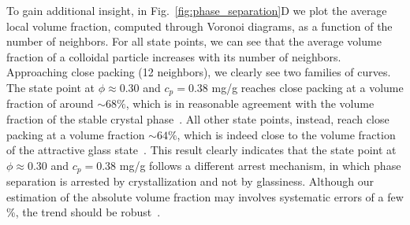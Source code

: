 \documentclass[12pt]{article}
\begin{document}
To gain additional insight, in Fig.~\ref{fig:phase_separation}D we plot the average local volume fraction, computed
through Voronoi diagrams, as a function of the number of neighbors. For all state points, we can see that the average volume fraction of a colloidal
particle increases with its number of neighbors. Approaching close packing (12 neighbors), we clearly see two families of curves. The state point
at $\phi\approx 0.30$ and $c_p=0.38$ mg/g reaches close packing at a volume fraction of around $\sim 68\%$, which is in reasonable agreement with the
volume fraction of the stable crystal phase~\cite{ilett1995phase}. All other state points, instead, reach close packing at a volume fraction $\sim 64\%$, which is
indeed close to the volume fraction of the attractive glass state~\cite{pham2002multiple}. 
This result clearly indicates that the state point at $\phi\approx 0.30$ and $c_p=0.38$ mg/g follows a different arrest mechanism, in which phase separation
is arrested by crystallization and not by glassiness. Although our estimation of the absolute volume fraction may involves systematic errors of a few \%, the trend should be robust~\cite{Poon2012}.


% 

% 
% 
\end{document}
